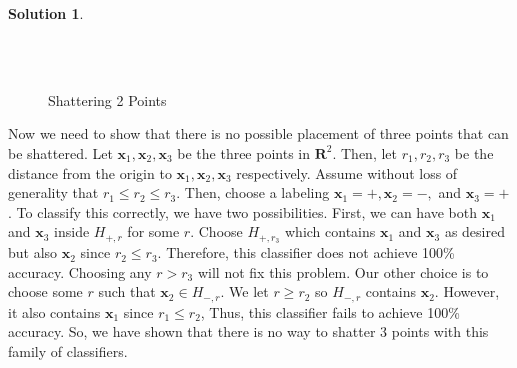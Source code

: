 \documentclass[12pt]{article}
\newcommand{\R}{\mathbf{R}}
\newcommand{\xb}{\mathbf{x}}
\theoremstyle{definition}
\newtheorem*{solution*}{Solution}
\begin{document}
\begin{solution*}
			\begin{figure}[H]
				\\
				 \\
				\caption{Shattering 2 Points}
				\label{fig:shattering2}
			\end{figure}
		
			Now we need to show that there is no possible placement of three points that can be shattered. Let $\xb_1,\xb_2,\xb_3$ be the three points in $\R^2$. Then, let $r_1,r_2,r_3$ be the distance from the origin to $\xb_1,\xb_2,\xb_3$ respectively. Assume without loss of generality that $r_1 \leq r_2 \leq r_3$. Then, choose a labeling $\xb_1 = +, \xb_2 = -,$ and $\xb_3 = +$. To classify this correctly, we have two possibilities. First, we can have both $\xb_1$ and $\xb_3$ inside $H_{+,r}$ for some $r$. Choose $H_{+,r_3}$ which contains $\xb_1$ and $\xb_3$ as desired but also $\xb_2$ since $r_2 \leq r_3$. Therefore, this classifier does not achieve 100\% accuracy. Choosing any $r > r_3$ will not fix this problem. Our other choice is to choose some $r$ such that $\xb_2 \in H_{-,r}$. We let $r \geq r_2$ so $H_{-,r}$ contains $\xb_2$. However, it also contains $\xb_1$ since $r_1 \leq r_2$, Thus, this classifier fails to achieve 100\% accuracy. So, we have shown that there is no way to shatter 3 points with this family of classifiers. 
			

\end{solution*}
\end{document}
